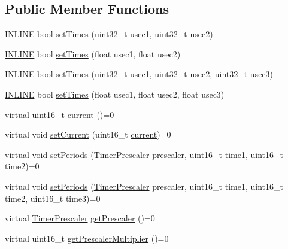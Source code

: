 \subsection*{Public Member Functions}
\begin{DoxyCompactItemize}
\item 
\hyperlink{io_8h_a2eb6f9e0395b47b8d5e3eeae4fe0c116}{I\-N\-L\-I\-N\-E} bool \hyperlink{classflame_1_1_timer_a76c79c63e82c6b0f1f498850b48a8cdf}{set\-Times} (uint32\-\_\-t usec1, uint32\-\_\-t usec2)
\item 
\hyperlink{io_8h_a2eb6f9e0395b47b8d5e3eeae4fe0c116}{I\-N\-L\-I\-N\-E} bool \hyperlink{classflame_1_1_timer_a69c34533372b494f5e239d95adbabfb3}{set\-Times} (float usec1, float usec2)
\item 
\hyperlink{io_8h_a2eb6f9e0395b47b8d5e3eeae4fe0c116}{I\-N\-L\-I\-N\-E} bool \hyperlink{classflame_1_1_timer_a5d0a30b4ad92c295b5943f7f69dc4fbf}{set\-Times} (uint32\-\_\-t usec1, uint32\-\_\-t usec2, uint32\-\_\-t usec3)
\item 
\hyperlink{io_8h_a2eb6f9e0395b47b8d5e3eeae4fe0c116}{I\-N\-L\-I\-N\-E} bool \hyperlink{classflame_1_1_timer_ab2260b0aada7c6037e1358c0faa00a06}{set\-Times} (float usec1, float usec2, float usec3)
\item 
virtual uint16\-\_\-t \hyperlink{classflame_1_1_timer_a97eb012afb61476de7597a4515c03d2d}{current} ()=0
\item 
virtual void \hyperlink{classflame_1_1_timer_a6b911bb96bd1723f20c98162a34b9867}{set\-Current} (uint16\-\_\-t \hyperlink{classflame_1_1_timer_a97eb012afb61476de7597a4515c03d2d}{current})=0
\item 
virtual void \hyperlink{classflame_1_1_timer_a1948822bf5c75866e5c2cf9ded4b3b9b}{set\-Periods} (\hyperlink{namespaceflame_a24dfd057ba5ab5a827abbc4ed902a087}{Timer\-Prescaler} prescaler, uint16\-\_\-t time1, uint16\-\_\-t time2)=0
\item 
virtual void \hyperlink{classflame_1_1_timer_a63987b6d5a76895a3afed120b621c8b4}{set\-Periods} (\hyperlink{namespaceflame_a24dfd057ba5ab5a827abbc4ed902a087}{Timer\-Prescaler} prescaler, uint16\-\_\-t time1, uint16\-\_\-t time2, uint16\-\_\-t time3)=0
\item 
virtual \hyperlink{namespaceflame_a24dfd057ba5ab5a827abbc4ed902a087}{Timer\-Prescaler} \hyperlink{classflame_1_1_timer_a7f8d6b44b6bfca103f9d91948c669a38}{get\-Prescaler} ()=0
\item 
virtual uint16\-\_\-t \hyperlink{classflame_1_1_timer_a08e913a8f802be0e7b46de3bf001bd3f}{get\-Prescaler\-Multiplier} ()=0
\item 

\end{DoxyCompactItemize}
